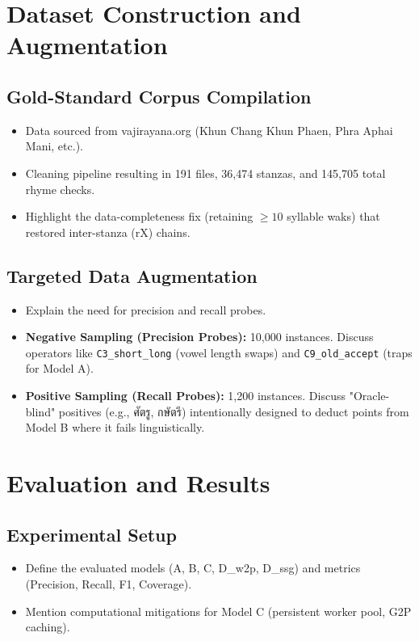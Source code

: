 \documentclass[conference]{IEEEtran}
\begin{document}
\section{Dataset Construction and Augmentation}
\subsection{Gold-Standard Corpus Compilation}
\begin{itemize}
    \item Data sourced from vajirayana.org (Khun Chang Khun Phaen, Phra Aphai Mani, etc.).
    \item Cleaning pipeline resulting in 191 files, 36,474 stanzas, and 145,705 total rhyme checks.
    \item Highlight the data-completeness fix (retaining $\geq 10$ syllable waks) that restored inter-stanza (rX) chains.
\end{itemize}

\subsection{Targeted Data Augmentation}
\begin{itemize}
    \item Explain the need for precision and recall probes.
    \item \textbf{Negative Sampling (Precision Probes):} 10,000 instances. Discuss operators like \texttt{C3\_short\_long} (vowel length swaps) and \texttt{C9\_old\_accept} (traps for Model A).
    \item \textbf{Positive Sampling (Recall Probes):} 1,200 instances. Discuss "Oracle-blind" positives (e.g., ศัตรู, กษัตรี) intentionally designed to deduct points from Model B where it fails linguistically.
\end{itemize}

\section{Evaluation and Results}
\subsection{Experimental Setup}
\begin{itemize}
    \item Define the evaluated models (A, B, C, D\_w2p, D\_ssg) and metrics (Precision, Recall, F1, Coverage).
    \item Mention computational mitigations for Model C (persistent worker pool, G2P caching).
\end{itemize}
\end{document}
